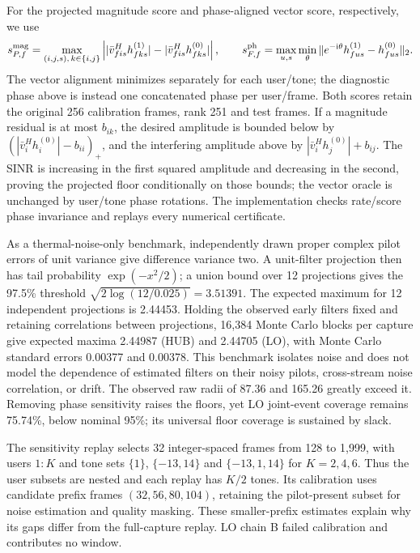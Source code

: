 For the projected magnitude score and phase-aligned vector score, respectively, we use
\[
s^{\rm mag}_{P,f}=\max_{(i,j,s),\,k\in\{i,j\}}
\left||\bar v_{fis}^Hh^{(1)}_{fks}|-|\bar v_{fis}^Hh^{(0)}_{fks}|\right|,
\qquad
s^{\rm ph}_{F,f}=\max_{u,s}\min_\theta
\|e^{-{\rm i}\theta}h^{(1)}_{fus}-h^{(0)}_{fus}\|_2 .
\]
The vector alignment minimizes separately for each user/tone; the diagnostic phase above is instead one concatenated phase per user/frame. Both scores retain the original 256 calibration frames, rank 251 and test frames. If a magnitude residual is at most \(b_{ik}\), the desired amplitude is bounded below by \((|\bar v_i^Hh_i^{(0)}|-b_{ii})_+\), and the interfering amplitude above by \(|\bar v_i^Hh_j^{(0)}|+b_{ij}\). The SINR is increasing in the first squared amplitude and decreasing in the second, proving the projected floor conditionally on those bounds; the vector oracle is unchanged by user/tone phase rotations. The implementation checks rate/score phase invariance and replays every numerical certificate.

As a thermal-noise-only benchmark, independently drawn proper complex pilot errors of unit variance give difference variance two. A unit-filter projection then has tail probability \(\exp(-x^2/2)\); a union bound over 12 projections gives the 97.5\% threshold \(\sqrt{2\log(12/0.025)}=3.51391\). The expected maximum for 12 independent projections is 2.44453. Holding the observed early filters fixed and retaining correlations between projections, 16,384 Monte Carlo blocks per capture give expected maxima 2.44987 (HUB) and 2.44705 (LO), with Monte Carlo standard errors 0.00377 and 0.00378. This benchmark isolates noise and does not model the dependence of estimated filters on their noisy pilots, cross-stream noise correlation, or drift. The observed raw radii of 87.36 and 165.26 greatly exceed it. Removing phase sensitivity raises the floors, yet LO joint-event coverage remains 75.74\%, below nominal 95\%; its universal floor coverage is sustained by slack.

\FloatBarrier
\begingroup{}

\endgroup
\FloatBarrier

\FloatBarrier



The sensitivity replay selects 32 integer-spaced frames from 128 to 1,999,
with users $1{:}K$ and tone sets $\{1\}$, $\{-13,14\}$ and $\{-13,1,14\}$
for $K=2,4,6$. Thus the user subsets are nested and each replay has $K/2$
tones. Its calibration uses candidate prefix frames $(32,56,80,104)$,
retaining the pilot-present subset for noise estimation and quality masking.
These smaller-prefix estimates explain why its gaps differ from the
full-capture replay. LO chain B failed calibration and contributes no window.

